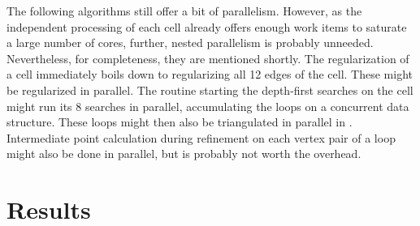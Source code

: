The following algorithms still offer a bit of parallelism.
However, as the independent processing of each cell already offers enough work items to saturate a large number of cores, further, nested parallelism is probably unneeded.
Nevertheless, for completeness, they are mentioned shortly.
The regularization of a cell immediately boils down to regularizing all 12 edges of the cell.
These might be regularized in parallel.
The  routine starting the depth-first searches on the cell might run its 8 searches in parallel, accumulating the loops on a concurrent data structure.
These loops might then also be triangulated in parallel in .
Intermediate point calculation during refinement on each vertex pair of a loop might also be done in parallel, but is probably not worth the overhead.


\section{Results}
\label{sec:tri_dexel_results}

